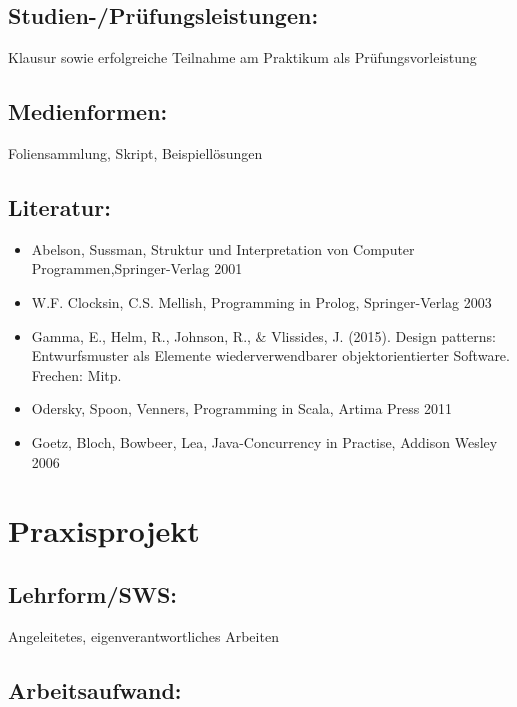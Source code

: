 \section{Studien-/Prüfungsleistungen:}\label{studien-pruxfcfungsleistungen-17}

Klausur sowie erfolgreiche Teilnahme am Praktikum als
Prüfungsvorleistung

\section{Medienformen:}\label{medienformen-17}

Foliensammlung, Skript, Beispiellösungen

\section{Literatur:}\label{literatur-17}

\begin{itemize}
\tightlist
\item
  Abelson, Sussman, Struktur und Interpretation von Computer
  Programmen,Springer-Verlag 2001
\item
  W.F. Clocksin, C.S. Mellish, Programming in Prolog, Springer-Verlag
  2003
\item
  Gamma, E., Helm, R., Johnson, R., \& Vlissides, J. (2015). Design
  patterns: Entwurfsmuster als Elemente wiederverwendbarer
  objektorientierter Software. Frechen: Mitp.
\item
  Odersky, Spoon, Venners, Programming in Scala, Artima Press 2011
\item
  Goetz, Bloch, Bowbeer, Lea, Java-Concurrency in Practise, Addison
  Wesley 2006
\end{itemize}

\chapter{Praxisprojekt}\label{praxisprojekt}

\section{Lehrform/SWS:}\label{lehrformsws-17}

Angeleitetes, eigenverantwortliches Arbeiten

\section{Arbeitsaufwand:}\label{arbeitsaufwand-17}

